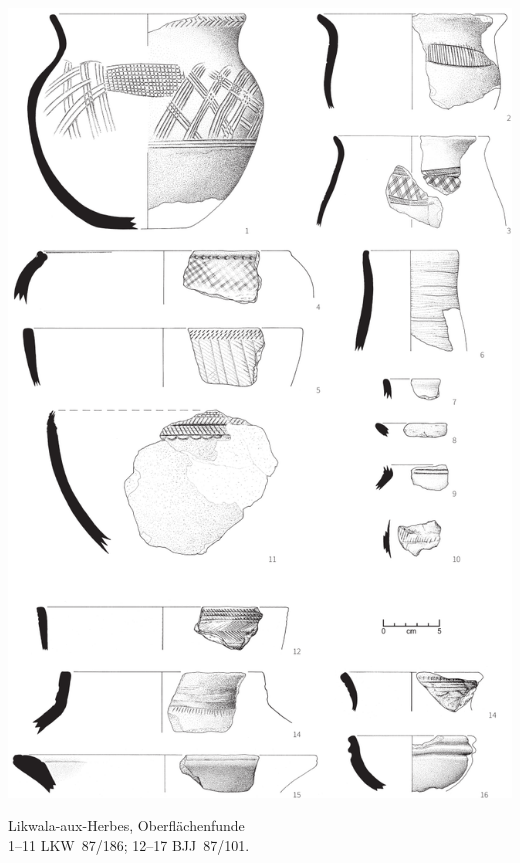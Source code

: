 \begin{pl}[H]
	\includegraphics{plt/Taf76.pdf}
	\vspace{.75em}\caption{Likwala-aux-Herbes, Oberflächenfunde \\ 1--11 LKW~87/186; 12--17 BJJ~87/101.}
	\label{pl:76}
\end{pl}

